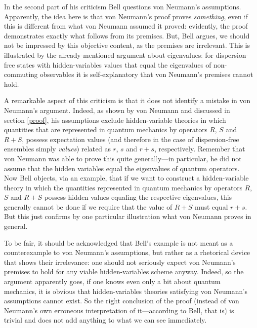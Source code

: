 \documentclass[12pt]{article}
\begin{document}
In the second part of his criticism Bell questions von Neumann's assumptions. Apparently, the idea here is that von Neumann's proof proves \emph{something}, even if this is different from what von Neumann assumed it proved: evidently, the proof demonstrates exactly what  follows from its premises. But, Bell argues, we should not be impressed by this objective content, as the premises are irrelevant. This is illustrated by the already-mentioned argument about eigenvalues: for dispersion-free states with hidden-variables values that equal the eigenvalues of non-commuting observables it is self-explanatory that von Neumann's premises cannot hold.

A remarkable aspect of this criticism is that it does not identify a mistake in von Neumann's argument. Indeed, as shown by von Neumann and discussed in section \ref{proof}, his assumptions exclude hidden-variable theories in which quantities that are represented in quantum mechanics by operators $R$, $S$ and $R+S$, possess expectation values (and therefore in the case of dispersion-free ensembles simply \emph{values}) related as $r$, $s$ and $r+s$, respectively. Remember that von Neumann was able to prove this quite generally---in particular, he did not assume that the hidden variables equal the eigenvalues of quantum operators. Now Bell objects, via an example, that if we want to construct a hidden-variable theory in which the quantities represented in quantum mechanics by operators $R$, $S$ and $R + S$ possess hidden values equaling the respective eigenvalues, this generally cannot be done if we require that the value of $R + S$ must equal $r + s$. But this just confirms by one particular illustration  what von Neumann proves in general.

To be fair, it should be acknowledged that Bell's example is not meant as a counterexample to von Neumann's assumptions, but rather as a rhetorical device that shows their irrelevance: one should not seriously expect von Neumann's premises to hold for any viable hidden-variables scheme anyway. Indeed, so the argument apparently goes, if one knows even only a bit about quantum mechanics, it is obvious that hidden-variables theories satisfying von Neumann's assumptions cannot exist. So the right conclusion of the proof (instead of von Neumann's own erroneous interpretation of it---according to Bell, that is) is trivial and does not add anything to what we can see immediately.
\end{document}
